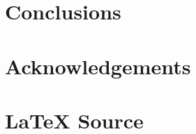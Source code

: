 \documentclass{article}
\theoremstyle{definition}
\begin{document}
\section{Conclusions}
%
%
%
\section{Acknowledgements}
%
%
\section*{\LaTeX \hspace{0.10 mm} Source}
%
%
%


%
%
\end{document}
